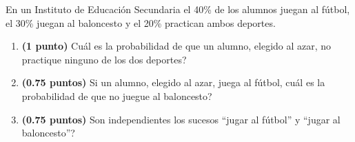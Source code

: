 
En un Instituto de Educación Secundaria el 40\% de los alumnos juegan al fútbol, el 30\% juegan al baloncesto y el 20\% practican ambos deportes.
\begin{enumerate}[label=\alph*)]
\item \textbf{(1 punto)} \textquestiondown{}Cuál es la probabilidad de que un alumno, elegido al azar, no practique ninguno de los dos deportes?
\item \textbf{(0.75 puntos)} Si un alumno, elegido al azar, juega al fútbol, \textquestiondown{}cuál es la probabilidad de que no juegue al baloncesto?
\item \textbf{(0.75 puntos)} \textquestiondown{}Son independientes los sucesos ``jugar al fútbol'' y ``jugar al baloncesto''?
\end{enumerate}
